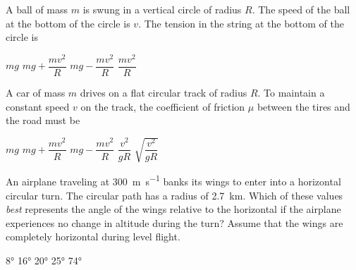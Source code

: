 \documentclass{../../oss-apphys-exam}
\begin{document}
\begin{multicols*}{2}
\begin{questions}
%      
%    
    
    \question A ball of mass $m$ is swung in a vertical circle of radius $R$.
    The speed of the ball at the bottom of the circle is $v$. The tension in
    the string at the bottom of the circle is
    \begin{choices}
      \choice $mg$
      \choice $mg+\dfrac{mv^2}R$
      \choice $mg-\dfrac{mv^2}R$
      \choice $\dfrac{mv^2}R$
    \end{choices}
    
    \question A car of mass $m$ drives on a flat circular track of radius $R$.
    To maintain a constant speed $v$ on the track, the coefficient of
    friction $\mu$ between the tires and the road must be
    \begin{choices}
      \choice $mg$
      \choice $mg+\dfrac{mv^2}R$
      \choice $mg-\dfrac{mv^2}R$
      \choice $\dfrac{v^2}{gR}$
      \choice $\sqrt{\dfrac{v^2}{gR}}$
    \end{choices}
    \columnbreak
    
    \question An airplane traveling at \SI{300}{\metre\per\second} banks its
    wings to enter into a horizontal circular turn. The circular path has a
    radius of \SI{2.7}{\kilo\metre}. Which of these values \emph{best}
    represents the angle of the wings relative to the horizontal if the airplane
    experiences no change in altitude during the turn? Assume that the wings
    are completely horizontal during level flight.
    \begin{choices}
      \choice\ang{8}
      \choice\ang{16}
      \choice\ang{20}
      \choice\ang{25}
      \correctchoice\ang{74}
    \end{choices}
    

\end{questions}
\end{multicols*}
\end{document}

